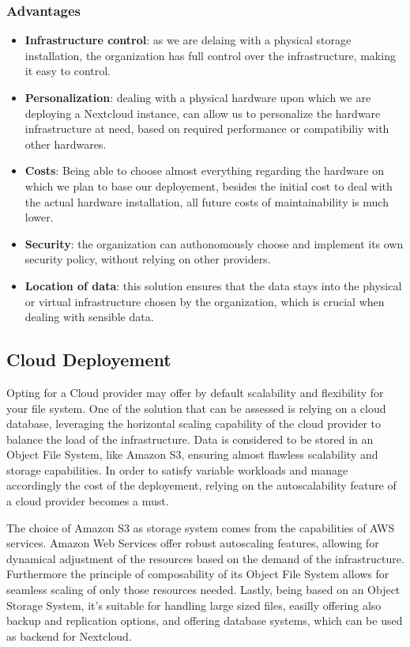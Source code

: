 \documentclass{article}
\begin{document}
	\subsubsection{Advantages}
	\begin{itemize}
		\item \textbf{Infrastructure control}:  as we are delaing with a physical storage installation, the organization has full control over the infrastructure, making it easy to control.
		\item \textbf{Personalization}: dealing with a physical hardware upon which we are deploying a Nextcloud instance, can allow us to personalize the hardware infrastructure at need, based on required performance or compatibiliy with other hardwares.
		\item \textbf{Costs}: Being able to choose almost everything regarding the hardware on which we plan to base our deployement, besides the initial cost to deal with the actual hardware installation, all future costs of maintainability is much lower.
		\item \textbf{Security}: the organization can authonomously choose and implement its own security policy, without relying on other providers.
		\item \textbf{Location of data}: this solution ensures that the data stays into the physical or virtual infrastructure chosen by the organization, which is crucial when dealing with sensible data.
	\end{itemize}
	
	\subsection{Cloud Deployement}
	Opting for a Cloud provider may offer by default scalability and flexibility for your file system. One of the solution that can be assessed is relying on a cloud database, leveraging the horizontal scaling capability of the cloud provider to balance the load of the infrastructure.
	Data is considered to be stored in an Object File System, like Amazon S3, ensuring almost flawless scalability and storage capabilities. In order to satisfy variable workloads and manage accordingly the cost of the deployement, relying on the autoscalability feature of a cloud provider becomes a must.
	
	The choice of Amazon S3 as storage system comes from the capabilities of AWS services. Amazon Web Services offer robust autoscaling features, allowing for dynamical adjustment of the resources based on the demand of the infrastructure. Furthermore the principle of composability of its Object File System allows for seamless scaling of only those resources needed. Lastly, being based on an Object Storage System, it's suitable for handling large sized files, easilly offering also backup and replication options, and offering database systems, which can be used as backend for Nextcloud.
	
\end{document}
